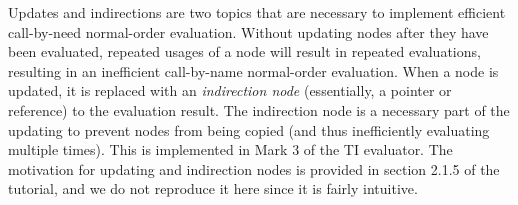 Updates and indirections are two topics that are necessary to implement efficient call-by-need normal-order evaluation. Without updating nodes after they have been evaluated, repeated usages of a node will result in repeated evaluations, resulting in an inefficient call-by-name normal-order evaluation. When a node is updated, it is replaced with an \textit{indirection node} (essentially, a pointer or reference) to the evaluation result. The indirection node is a necessary part of the updating to prevent nodes from being copied (and thus inefficiently evaluating multiple times). This is implemented in Mark 3 of the TI evaluator. The motivation for updating and indirection nodes is provided in section 2.1.5 of the tutorial, and we do not reproduce it here since it is fairly intuitive.


